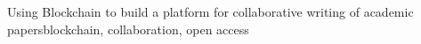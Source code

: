 \begin{englishabstract}{Using Blockchain to build a platform for collaborative writing of academic papers}{blockchain, collaboration, open access}

\end{englishabstract}
